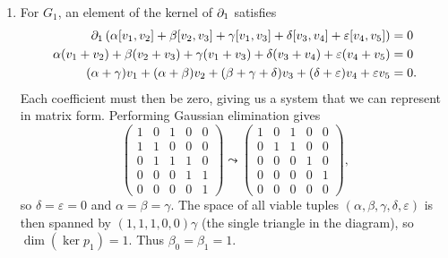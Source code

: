 \documentclass[twoside,10pt]{article}
\begin{document}
\begin{enumerate}
	\item For $G_1$, an element of the kernel of $\partial_1$ satisfies
		\begin{align*}
			\partial_1\left( \alpha[v_1,v_2]+\beta[v_2,v_3]+\gamma[v_1,v_3]+\delta[v_3,v_4]+\varepsilon[v_4,v_5] \right) &= 0 \\
			\alpha(v_1+v_2) + \beta(v_2+v_3)+\gamma(v_1+v_3)+\delta(v_3+v_4)+\varepsilon(v_4+v_5) &= 0 \\
			(\alpha+\gamma)v_1 +(\alpha+\beta)v_2+(\beta+\gamma+\delta)v_3+(\delta+\varepsilon)v_4+\varepsilon v_5 &= 0.
		\end{align*}
		Each coefficient must then be zero, giving us a system that we can represent in matrix form. Performing Gaussian elimination gives
		\[
		\begin{pmatrix}
			1 & 0 & 1 & 0 & 0 \\
			1 & 1 & 0 & 0 & 0 \\
			0 & 1 & 1 & 1 & 0 \\
			0 & 0 & 0 & 1 & 1 \\
			0 & 0 & 0 & 0 & 1
		\end{pmatrix}
		\leadsto
		\begin{pmatrix}
                        1 & 0 & 1 & 0 & 0 \\
                        0 & 1 & 1 & 0 & 0 \\
                        0 & 0 & 0 & 1 & 0 \\
                        0 & 0 & 0 & 0 & 1 \\
                        0 & 0 & 0 & 0 & 0
                \end{pmatrix},
	\] so $\delta = \varepsilon = 0$ and $\alpha=\beta=\gamma$. The space of all viable tuples $(\alpha,\beta,\gamma,\delta,\varepsilon)$ is then spanned by $(1, 1, 1, 0, 0)\gamma$ (the single triangle in the diagram), so $\dim(\ker p_1) = 1$. Thus $\beta_0=\beta_1 = 1$.


\end{enumerate}
\end{document}
